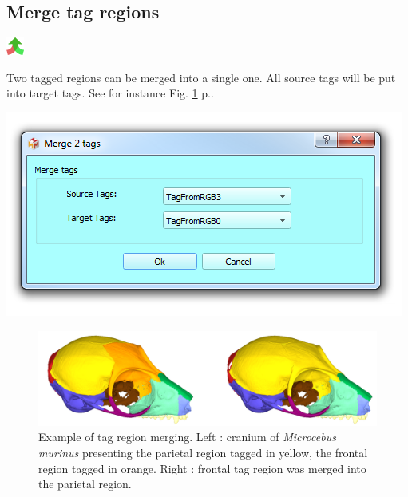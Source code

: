 \subsection{Merge tag regions}
\includegraphics[scale=0.7]{images/12/merge.png}\\
\noindent
\begin{minipage}{0.5\textwidth}
Two tagged regions can be merged into a single one. All source tags will be put into target tags. See for instance Fig. \ref{merge_tags} p.\pageref{merge_tags}.\end{minipage}    
\begin{minipage}{0.5\textwidth}\centering
  \includegraphics[scale=0.5]{images/12/merge_tags.png}
 \end{minipage} 
\noindent
\begin{figure}
  \centering
  \includegraphics[scale=0.25]{images/12/merge_example.png} 
	\caption{Example of tag region merging. Left : cranium of \textit{Microcebus murinus} presenting the parietal region
tagged in yellow, the frontal region tagged in orange. Right : frontal tag region was merged into
the parietal region.}
\label{merge_tags}
\end{figure}